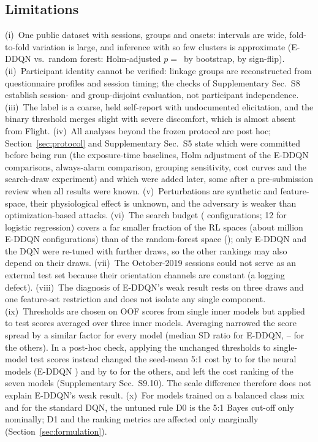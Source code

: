 \subsection{Limitations}
\label{sec:limits}
(i)~One public dataset with \nSessionsEval{} sessions, \nGroupsEval{} groups and \nEventSessions{} onsets: intervals are wide, fold-to-fold variation is large, and inference with so few clusters is approximate (E-DDQN vs.\ random forest: Holm-adjusted $p=$\,\PHHolmRF{} by bootstrap, \PHSfRFHolm{} by sign-flip). (ii)~Participant identity cannot be verified: linkage groups are reconstructed from questionnaire profiles and session timing; the checks of Supplementary Sec.~S8 establish session- and group-disjoint evaluation, not participant independence. (iii)~The label is a coarse, held self-report with undocumented elicitation, and the binary threshold merges slight with severe discomfort, which is almost absent from Flight. (iv)~All analyses beyond the frozen protocol are post hoc; Section~\ref{sec:protocol} and Supplementary Sec.~S5 state which were committed before being run (the exposure-time baselines, Holm adjustment of the E-DDQN comparisons, always-alarm comparison, grouping sensitivity, cost curves and the search-draw experiment) and which were added later, some after a pre-submission review when all results were known. (v)~Perturbations are synthetic and feature-space, their physiological effect is unknown, and the adversary is weaker than optimization-based attacks. (vi)~The search budget (\HPOBudget{} configurations; 12 for logistic regression) covers a far smaller fraction of the RL spaces (about \PHSpaceEDDQNMillion{} million E-DDQN configurations) than of the random-forest space (\PHSpaceRF); only E-DDQN and the DQN were re-tuned with further draws, so the other rankings may also depend on their draws. (vii)~The October-2019 sessions could not serve as an external test set because their orientation channels are constant (a logging defect). (viii)~The diagnosis of E-DDQN's weak result rests on three draws and one feature-set restriction and does not isolate any single component. (ix)~Thresholds are chosen on OOF scores from single inner models but applied to test scores averaged over three inner models. Averaging narrowed the score spread by a similar factor for every model (median SD ratio \TSSpreadEDDQN{} for E-DDQN, \TSSpreadOtherMin--\TSSpreadOtherMax{} for the others). In a post-hoc check, applying the unchanged thresholds to single-model test scores instead changed the seed-mean 5:1 cost by \TSNeuralDeltaCostMin{} to \TSNeuralDeltaCostMax{} for the neural models (E-DDQN \TSEDDQNDeltaCost) and by \TSTreeLRDeltaCostMin{} to \TSTreeLRDeltaCostMax{} for the others, and left the cost ranking of the seven models \TSRankUnchanged{} (Supplementary Sec.~S9.10). The scale difference therefore does not explain E-DDQN's weak result. (x)~For models trained on a balanced class mix and for the standard DQN, the untuned rule D0 is the 5:1 Bayes cut-off only nominally; D1 and the ranking metrics are affected only marginally (Section~\ref{sec:formulation}).

